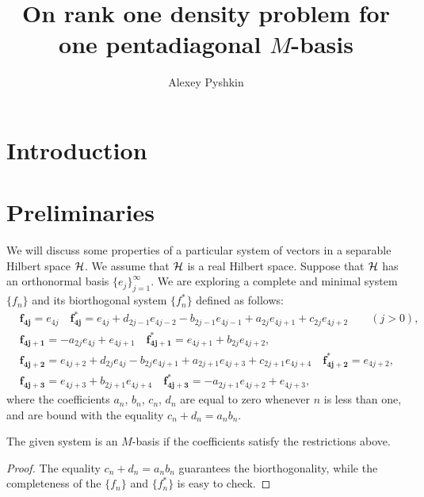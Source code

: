 \documentclass[12pt]{amsart}
\theoremstyle{case}
\begin{document}
\title{On rank one density problem for one pentadiagonal $M$-basis}
\author{Alexey Pyshkin}
\maketitle

\section{Introduction}
\section{Preliminaries}
  We will discuss some properties of a particular system of vectors in a separable Hilbert space $\cal{H}$.
  We assume that $\cal{H}$ is a real Hilbert space. 
  Suppose that $\cal{H}$ has an orthonormal basis $\{e_j\}_{j=1}^\infty$.
  We are exploring a complete and minimal system $\{f_n\}$ and its biorthogonal system $\{f^*_n\}$ defined as follows:
  \begin{equation}
    \label{main-system}
    \begin{aligned}
      &\mathbf{f_{4j}} = e_{4j} \quad 
      \mathbf{f^*_{4j}} = e_{4j} + d_{2j - 1} e_{4j-2} - b_{2j-1} e_{4j-1} + a_{2j} e_{4j+1} + c_{2j} e_{4j+2} \qquad
      (j > 0),\\
      &\mathbf{f_{4j+1}} = -a_{2j} e_{4j} + e_{4j+1} \quad 
      \mathbf{f^*_{4j+1}} = e_{4j+1} + b_{2j} e_{4j+2},\\
      &\mathbf{f_{4j+2}} = e_{4j+2} + d_{2j} e_{4j} - b_{2j} e_{4j+1} + a_{2j+1} e_{4j+3} + c_{2j+1} e_{4j+4}\quad
      \mathbf{f^*_{4j+2}} = e_{4j+2},\\
      &\mathbf{f_{4j+3}} = e_{4j+3} + b_{2j+1} e_{4j+4}\quad
      \mathbf{f^*_{4j+3}} = -a_{2j+1} e_{4j+2} + e_{4j+3},
    \end{aligned}
  \end{equation}
    where the coefficients $a_n$, $b_n$, $c_n$, $d_n$ are equal to zero whenever $n$ is less than one, and are bound with the equality
    $c_n + d_n = a_n b_n$. 
  \begin{prop}
    The given system is an $M$-basis if the coefficients satisfy the restrictions above.
  \end{prop}
  \begin{proof}
    The equality $c_n + d_n = a_n b_n$ guarantees the bi\-orthogonality,
    while the completeness of the $\{f_n\}$ and $\{f_n^*\}$ is
    easy to check.
  \end{proof}
  
\end{document}
